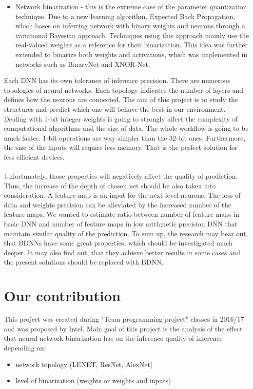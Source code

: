 \documentclass[licencjacka]{pracamgr}
\begin{document}
\begin{itemize}
		\item Network binarization - this is the extreme case of the parameter quantization technique. Due to a new learning algorithm, Expected Back Propagation, which bases on inferring network with binary weights and neurons through a variational Bayesian approach. Techniques using this approach mainly use the real-valued weights as a reference for their binarization. This idea was further extended to binarize both weights and activations, which was implemented in networks such as BinaryNet and XNOR-Net. 

	\end{itemize}

	Each DNN has its own tolerance of inference precision. There are numerous topologies of neural networks. Each topology indicates the number of layers and defines how the neurons are connected. The aim of this project is to study the structures and predict which one will behave the best in our environment. Dealing with 1-bit integer weights is going to strongly affect the complexity of computational algorithms and the size of data. The whole workflow is going to be much faster. 1-bit operations are way simpler than the 32-bit ones. Furthermore, the size of the inputs will require less memory. That is the perfect solution for less efficient devices. 
	\\\\
	Unfortunately, those properties will negatively affect the quality of prediction. Thus, the increase of the depth of chosen net should be also taken into consideration. A feature map is an input for the next level neurons.  The loss of data and weights precision can be alleviated by the increased number of the feature maps. We wanted to estimate ratio between number of feature maps in basic DNN and number of feature maps in low arithmetic precision DNN that maintain similar quality of the prediction.
	 To sum up, the research may bear out, that BDNNs have some great properties, which should be investigated much deeper. It may also find out, that they achieve better results in some cases and the present solutions should be replaced with BDNN.    

	\section{Our contribution}
	
	This project was created during "Team programming project" classes in 2016/17 and was proposed by Intel. Main goal of this project is the analysis of the effect that neural network binarization has on the inference quality of inference depending on:
	\begin{itemize}
	    \item network topology (LENET, ResNet, AlexNet)
	    \item level of binarization (weights or weights and inputs)
	\end{itemize}
	
\end{document}
